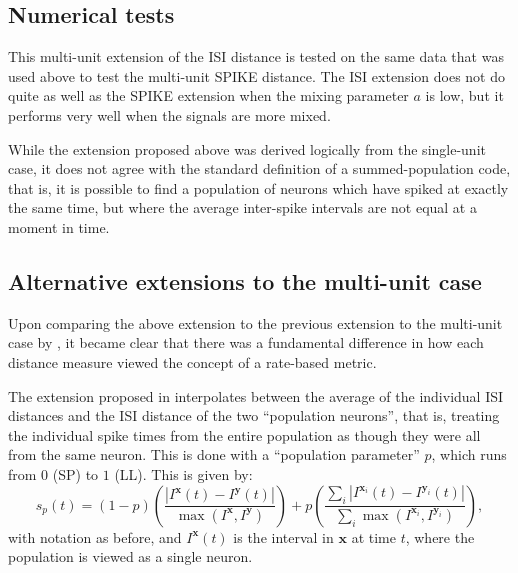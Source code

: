 \subsection{Numerical tests}
This multi-unit extension of the ISI distance is tested on the same data that was used above to test the multi-unit SPIKE distance. The ISI extension does not do quite as well as the SPIKE extension when the mixing parameter $a$ is low, but it performs very well when the signals are more mixed.

%
%

While the extension proposed above was derived logically from the single-unit case, it does not agree with the standard definition of a summed-population code, that is, it is possible to find a population of neurons which have spiked at exactly the same time, but where the average inter-spike intervals are not equal at a moment in time.

\subsection{Alternative extensions to the multi-unit case}

Upon comparing the above extension to the previous extension to the multi-unit case by \citet{KreuzEtAl2009a}, it became clear that there was a fundamental difference in how each distance measure viewed the concept of a rate-based metric.


The extension proposed in \citep{KreuzEtAl2009a} interpolates between the average of the individual ISI distances and the ISI distance of the two ``population neurons'', that is, treating the individual spike times from the entire population as though they were all from the same neuron.  This is done with a ``population parameter'' $p$, which runs from $0$ (SP) to $1$ (LL).  This is given by:
\begin{equation}
\label{pop}
s_p(t) = (1-p)\left( \frac{ | I^{\mathbf{x}}(t) - I^{\mathbf{y}}(t) |}{ \max (I^{\mathbf{x}},I^{\mathbf{y}})}\right) + p\left( \frac{\sum_i | I^{\mathbf{x}_i}(t) - I^{\mathbf{y}_i}(t) |}{\sum_i \max (I^{\mathbf{x}_i},I^{\mathbf{y}_i})} \right),
\end{equation}
with notation as before, and $I^{\mathbf{x}}(t)$ is the interval in $\mathbf{x}$ at time $t$, where the population is viewed as a single neuron.

